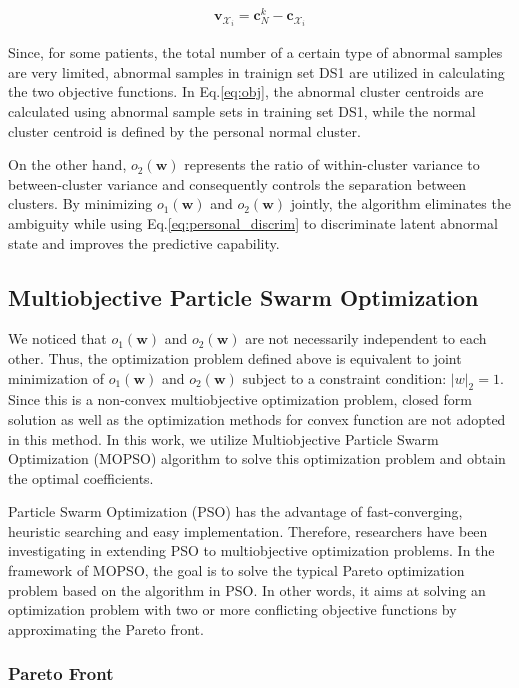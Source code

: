 \begin{align}
\mathbf{v}_{\mathcal{X}_i} = \mathbf{c}^k_N -  \mathbf{c}_{\mathcal{X}_i}
\end{align}

Since, for some patients, the total number of a certain type of abnormal samples are very limited, abnormal samples in trainign set DS1 are utilized in calculating the two objective functions. In Eq.\ref{eq:obj}, the abnormal cluster centroids are calculated using abnormal sample sets in training set DS1, while the normal cluster centroid is defined by the personal normal cluster. 

On the other hand, $o_2(\mathbf{w})$ represents the ratio of within-cluster variance to between-cluster variance and consequently controls the separation between clusters. By minimizing $o_1(\mathbf{w})$ and $o_2(\mathbf{w})$ jointly, the algorithm eliminates the ambiguity while using Eq.\ref{eq:personal_discrim} to discriminate latent abnormal state and improves the predictive capability.

\subsection{Multiobjective Particle Swarm Optimization}

We noticed that $o_1(\mathbf{w}) $ and $o_2(\mathbf{w})$ are not necessarily independent to each other. Thus, the optimization problem defined above is equivalent to joint minimization of $o_1(\mathbf{w}) $ and $o_2(\mathbf{w})$ subject to a constraint condition: $|w|_2=1$. Since this is a non-convex multiobjective optimization problem, closed form solution as well as the optimization methods for convex function are not adopted in this method. In this work, we utilize Multiobjective Particle Swarm Optimization (MOPSO) algorithm to solve this optimization problem and obtain the optimal coefficients.

Particle Swarm Optimization (PSO) has the advantage of fast-converging, heuristic searching and easy implementation\cite{coello2002mopso, alvarez2005mopso}. Therefore, researchers have been investigating in extending PSO to multiobjective optimization problems. In the framework of MOPSO, the goal is to solve the typical Pareto optimization problem based on the algorithm in PSO. In other words, it aims at solving an optimization problem with two or more conflicting objective functions by approximating the Pareto front. 

\subsubsection{Pareto Front}

